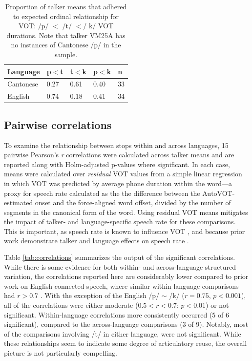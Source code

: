 \begin{table}[th]
\caption{Proportion of talker means that adhered to expected ordinal relationship for VOT: /p/ $<$ /t/ $<$/ k/ VOT durations. Note that talker VM25A has no instances of Cantonese /p/ in the sample.}
  \label{tab:ordrel}
  \centering
  \begin{tabular}{lllll}
    \toprule
    \textbf{Language} & \textbf{p$<$t} & \textbf{t$<$k} & \textbf{p$<$k} & n \\
    \midrule
    Cantonese	& 0.27	& 0.61	& 0.40	& 33 \\
    English	    & 0.74	& 0.18	& 0.41	& 34 \\
    \bottomrule
  \end{tabular}
\end{table}

\subsection{Pairwise correlations}

To examine the relationship between stops within and across languages, 15 pairwise Pearson's \textit{r} correlations were calculated across talker means and are reported along with Holm-adjusted p-values where significant. In each case, means were calculated over \textit{residual} VOT values from a simple linear regression in which VOT was predicted by average phone duration within the word---a proxy for speech rate calculated as the the difference between the AutoVOT-estimated onset and the force-aligned word offset, divided by the number of segments in the canonical form of the word. Using residual VOT means mitigates the impact of talker- and language-specific speech rate for these comparisons. This is important, as speech rate is known to influence VOT \citep{chodroff_2017_structure}, and because prior work demonstrate talker and language effects on speech rate \citep{bradlow_2017_rate}. 

Table \ref{tab:correlations} summarizes the output of the significant correlations. While there is some evidence for both within- and across-language structured variation, the correlations reported here are considerably lower compared to prior work on English connected speech, where similar within-language comparisons had $r>0.7$ \citep{chodroff_2017_structure,chodroff_2019_l2}. With the exception of the English /p/ $\sim$ /k/ ($r=0.75$, $p<0.001$), all of the correlations were either moderate ($0.5<r<0.7$; $p<0.01$) or not significant. Within-language correlations more consistently occurred (5 of 6 significant), compared to the across-language comparisons (3 of 9). Notably, most of the comparisons involving /t/ in either language, were not significant. While these relationships seem to indicate some degree of articulatory reuse, the overall picture is not particularly compelling. 


